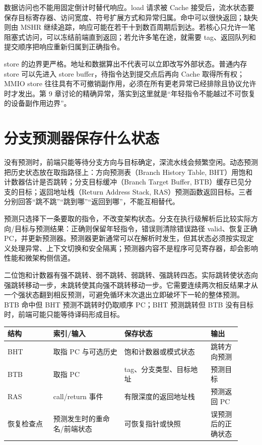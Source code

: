 数据访问也不能用固定倒计时替代响应。load 请求被 Cache 接受后，流水状态要保存目标寄存器、访问宽度、符号扩展方式和异常归属。命中可以很快返回；缺失则由 MSHR 继续追踪，响应可能在若干十到数百周期后到达。若核心只允许一笔阻塞式访问，可以冻结前端直到返回；若允许多笔在途，就需要 tag、返回队列和提交顺序把响应重新归属到正确指令。

store 的边界更严格。地址和数据算出不代表可以立即改写外部状态。普通内存 store 可以先进入 store buffer，待指令达到提交点后再向 Cache 取得所有权；MMIO store 往往具有不可撤销副作用，必须在所有更老异常已经排除且协议允许时才发出。第 9 章讨论的精确异常，落实到这里就是“年轻指令不能越过不可恢复的设备副作用边界”。

\section{分支预测器保存什么状态}

没有预测时，前端只能等待分支方向与目标确定，深流水线会频繁空闲。动态预测把历史状态放在取指路径上：方向预测表（Branch History Table, BHT）用饱和计数器估计是否跳转；分支目标缓冲（Branch Target Buffer, BTB）缓存已见分支的目标；返回地址栈（Return Address Stack, RAS）预测函数返回目标。三者分别回答“跳不跳”“跳到哪”“返回到哪”，不能互相替代。

预测只选择下一条要取的指令，不改变架构状态。分支在执行级解析后比较实际方向/目标与预测结果：正确则保留年轻指令，错误则清除错误路径 valid、恢复正确 PC，并更新预测器。预测器更新通常可以在解析时发生，但其状态必须按实现定义处理异常、上下文切换和安全隔离；预测器内容不是程序可见寄存器，却会影响性能和微架构侧信道。

二位饱和计数器有强不跳转、弱不跳转、弱跳转、强跳转四态。实际跳转使状态向强跳转移动一步，未跳转使其向强不跳转移动一步。它需要连续两次相反结果才从一个强状态翻到相反预测，可避免循环末次退出立即破坏下一轮的整体预测。BTB 命中但 BHT 预测不跳转时仍取顺序 PC；BHT 预测跳转但 BTB 没有目标时，前端可能只能等待译码形成目标。

\begin{longtable}{L{0.18\linewidth}L{0.28\linewidth}L{0.34\linewidth}L{0.12\linewidth}}
\toprule
结构 & 索引/输入 & 保存状态 & 输出 \\
\midrule
BHT & 取指 PC 与可选历史 & 饱和计数器或模式状态 & 跳转方向预测 \\
BTB & 取指 PC & tag、分支类型、目标地址 & 预测目标 \\
RAS & call/return 事件 & 有限深度的返回地址栈 & 预测返回 PC \\
恢复检查点 & 预测发生时的重命名/前端状态 & 可恢复指针或快照 & 误预测后的正确状态 \\
\bottomrule
\end{longtable}

